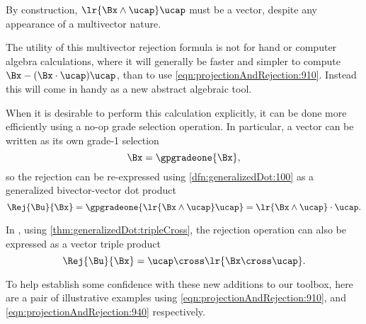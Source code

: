 By construction,
\( \lr{ \Bx \wedge \ucap } \ucap \) must be a vector, despite any appearance of a multivector nature.

The utility of this multivector rejection formula is not for hand or computer algebra calculations, where it will generally be faster and simpler to compute \( \Bx - (\Bx \cdot \ucap) \ucap \), than to use \cref{eqn:projectionAndRejection:910}.
Instead this will come in handy as a new abstract algebraic tool.

When it is desirable to perform this calculation explicitly, it can be done more efficiently using a no-op grade selection operation.
In particular, a vector can be written as its own grade-1 selection
\begin{equation}\label{eqn:projectionAndRejection:920}
\Bx = \gpgradeone{ \Bx },
\end{equation}
so the rejection can be re-expressed
using \cref{dfn:generalizedDot:100}
as a generalized bivector-vector dot product
\begin{equation}\label{eqn:projectionAndRejection:940}
\Rej{\Bu}{\Bx}
= \gpgradeone{ \lr{ \Bx \wedge \ucap } \ucap }
= \lr{ \Bx \wedge \ucap } \cdot \ucap.
\end{equation}

In , using \cref{thm:generalizedDot:tripleCross}, the rejection operation can also be expressed as a vector triple product
\begin{equation}\label{eqn:projectionAndRejection:1140}
\Rej{\Bu}{\Bx}
= \ucap \cross \lr{ \Bx \cross \ucap }.
\end{equation}

To help establish some confidence with these new additions to our toolbox, here are a
pair of illustrative examples using
\cref{eqn:projectionAndRejection:910}, and
\cref{eqn:projectionAndRejection:940} respectively.


